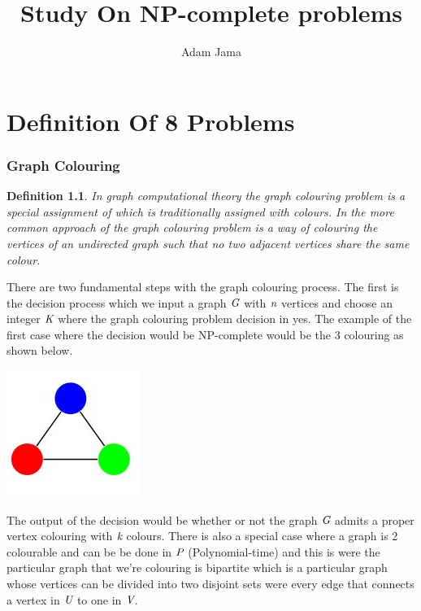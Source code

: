 \documentclass[a4paper]{report}
\newtheorem{defi}{Definition}
\begin{document}
\title{Study On NP-complete problems}
\author{Adam Jama}

\maketitle


\chapter{Definition Of 8 Problems}

\subsection{Graph Colouring}
\begin{defi}
In graph computational theory the graph colouring problem is a special assignment of which is traditionally assigned with colours. In the more common approach of the graph colouring problem is a way of colouring the vertices of an undirected graph such that no two adjacent vertices share the same colour.
\end{defi}

There are two fundamental steps with the graph colouring process. The first is the decision process which we input a graph $\emph{G}$ with $\emph{n}$ vertices and choose an integer $\emph{K}$ where the graph colouring problem decision in yes. The example of the first case where the decision would be NP-complete would be the 3 colouring as shown below.



\begin{center}
\includegraphics[scale=0.77]{3colouring.png}
\end{center}

The output of the decision would be whether or not the graph $\emph{G}$ admits a proper vertex colouring with $\emph{k}$ colours. There is also a special case where a graph is 2 colourable and can be be done in $\emph{P}$ (Polynomial-time) and this is were the particular graph that we're colouring is bipartite which is a particular graph whose vertices can be divided into two disjoint sets were every edge that connects a vertex in $\emph{U}$ to one in $\emph{V}$.
\end{document}
